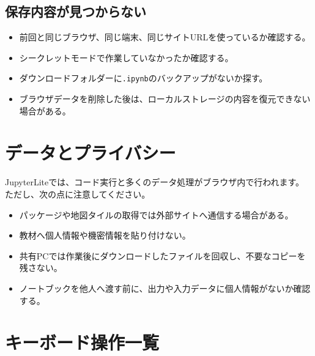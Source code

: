 \documentclass[a4paper,11pt]{ltjsarticle}
\begin{document}
\subsection{保存内容が見つからない}

\begin{itemize}
  \item 前回と同じブラウザ、同じ端末、同じサイトURLを使っているか確認する。
  \item シークレットモードで作業していなかったか確認する。
  \item ダウンロードフォルダーに\texttt{.ipynb}のバックアップがないか探す。
  \item ブラウザデータを削除した後は、ローカルストレージの内容を復元できない場合がある。
\end{itemize}

\section{データとプライバシー}

JupyterLiteでは、コード実行と多くのデータ処理がブラウザ内で行われます。
ただし、次の点に注意してください。

\begin{itemize}
  \item パッケージや地図タイルの取得では外部サイトへ通信する場合がある。
  \item 教材へ個人情報や機密情報を貼り付けない。
  \item 共有PCでは作業後にダウンロードしたファイルを回収し、不要なコピーを残さない。
  \item ノートブックを他人へ渡す前に、出力や入力データに個人情報がないか確認する。
\end{itemize}

\section{キーボード操作一覧}
\end{document}
